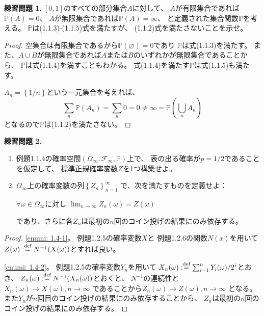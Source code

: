 \documentclass[uplatex]{jsarticle}
\theoremstyle{definition}
\newtheorem{prob}[prob]{練習問題}
\renewcommand{\emptyset}{\varnothing}
\def\P{\mathbb{P}}
\def\mcF{\mathcal{F}}
\def\dfn{:\overset{\mbox{{\scriptsize def}}}{=}}
\begin{document}
\begin{prob}\label{prob: 1.3}
  \([0,1]\)のすべての部分集合\(A\)に対して、
  \(A\)が有限集合であれば\(\P(A)=0\)、
  \(A\)が無限集合であれば\(\P(A)=\infty\)、
  と定義された集合関数\(\P\)を考える。
  \(\P\)は(1.1.3)-(1.1.5)式を満たすが、
  (1.1.2)式を満たさないことを示せ。
\end{prob}

\begin{proof}
  空集合は有限集合であるから\(\P(\emptyset) = 0\)であり
  \(\P\)は式(1.1.3)を満たす。
  また、\(A\cup B\)が無限集合であれば\(A\)または\(B\)のいずれかが無限集合であることから、
  \(\P\)は式(1.1.4)を満すこともわかる。
  式(1.1.4)を満たす\(\P\)は式(1.1.5)も満たす。

  \(A_n = \left\{ 1/n\right\}\)という一元集合を考えれば、
  \[
  \sum _n \P(A_n) = \sum _n 0 = 0 \neq \infty = \P\left(\bigcup_n A_n\right)
  \]
  となるので\(\P\)は(1.1.2)を満たさない。
\end{proof}



\begin{prob}\label{prob: 1.4}
  \
  \begin{enumerate}
    \item \label{enumi: 1.4-1}
    例題1.1.4の確率空間\((\Omega_{\infty},\mcF_{\infty},\P)\)上で、
    表の出る確率が\(p=1/2\)であることを仮定して、
    標準正規確率変数\(Z\)を1つ構築せよ。
    \item \label{enumi: 1.4-2}
    \(\Omega_{\infty}\)上の確率変数の列\(\left\{Z_n\right\}_{n=1}^\infty\)
    で、次を満たすものを定義せよ：
    \begin{center}
      \(\forall \omega\in\Omega_{\infty}\)に対し
      \(\lim_{n\to \infty}Z_n(\omega)=Z(\omega)\)
    \end{center}
    であり、さらに各\(Z_n\)は最初の\(n\)回のコイン投げの結果にのみ依存する。
  \end{enumerate}
\end{prob}

\begin{proof}
  \ref{enumi: 1.4-1}。
  例題1.2.5の確率変数\(X\)と
  例題1.2.6の関数\(N(x)\)を用いて
  \(Z(\omega)\dfn N^{-1}(X(\omega))\)とすれば良い。

  \ref{enumi: 1.4-2}。
  例題1.2.5の確率変数\(Y_n\)を用いて
  \(X_n(\omega) \dfn \sum _{i=1}^n Y_i(\omega)/2^i\)とおき、
  \(Z_n(\omega) \dfn N^{-1}(X_n(\omega))\)とおくと、
  \(N^{-1}\)の連続性と
  \(X_n(\omega) \to X(\omega) , n\to \infty\)
  であることから\(Z_n(\omega) \to Z(\omega) , n\to \infty\)
  となる。
  また\(Y_n\)が\(n\)回目のコイン投げの結果にのみ依存することから、
  \(Z_n\)は最初の\(n\)回のコイン投げの結果にのみ依存する。
\end{proof}
\end{document}
